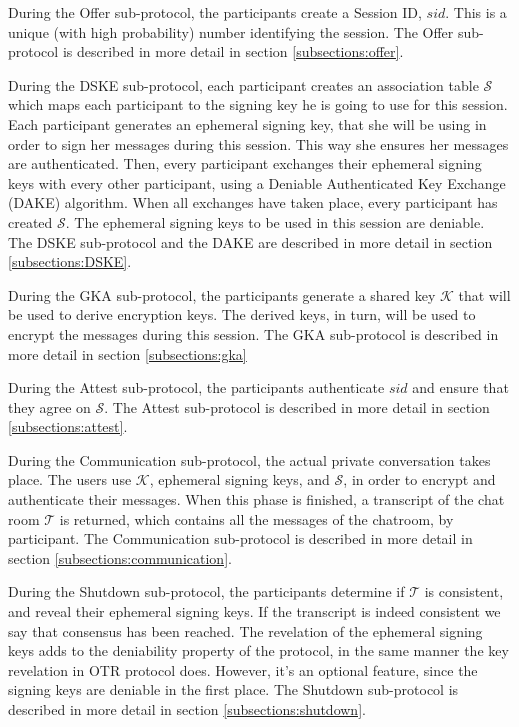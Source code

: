 During the Offer sub-protocol, the participants create a Session ID, $sid$. This is a unique (with high probability) number identifying the session. The Offer sub-protocol is described in more detail in section \ref{subsections:offer}. 

During the DSKE sub-protocol, each participant creates an association table $\mathcal{S}$ which maps each participant to the signing key he is going to use for this session. Each participant generates an ephemeral signing key, that she will be using in order to sign her messages during this session. This way she ensures her messages are authenticated. Then, every participant exchanges their ephemeral signing keys with every other participant, using a Deniable Authenticated Key Exchange (DAKE) algorithm. When all exchanges have taken place, every participant has created $\mathcal{S}$. The ephemeral signing keys to be used in this session are deniable. The DSKE sub-protocol and the DAKE are described in more detail in section \ref{subsections:DSKE}.

During the GKA sub-protocol, the participants generate a shared key $\mathcal{K}$ that will be used to derive encryption keys. The derived keys, in turn, will be used to encrypt the messages during this session. The GKA sub-protocol is described in more detail in section \ref{subsections:gka}

During the Attest sub-protocol, the participants authenticate $sid$ and ensure that they agree on $\mathcal{S}$. The Attest sub-protocol is described in more detail in section \ref{subsections:attest}. 

During the Communication sub-protocol, the actual private conversation takes place. The users use $\mathcal{K}$, ephemeral signing keys, and $\mathcal{S}$, in order to encrypt and authenticate their messages. When this phase is finished, a transcript of the chat room $\mathcal{T}$ is returned, which contains all the messages of the chatroom, by participant. The Communication sub-protocol is described in more detail in section \ref{subsections:communication}. 

During the Shutdown sub-protocol, the participants determine if $\mathcal{T}$ is consistent, and reveal their ephemeral signing keys. If the transcript is indeed consistent we say that consensus has been reached. The revelation of the ephemeral signing keys adds to the deniability property of the protocol, in the same manner the key revelation in OTR protocol does. However, it’s an optional feature, since the signing keys are deniable in the first place. The Shutdown sub-protocol is described in more detail in section \ref{subsections:shutdown}. 


